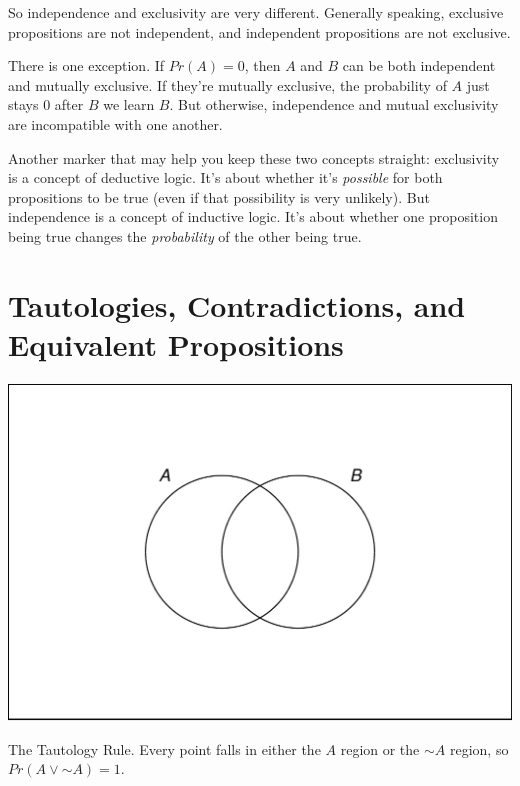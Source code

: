 \documentclass[justified]{tufte-book}
\renewcommand{\neg}{\mathbin{\sim}}
\newcommand{\p}{Pr}
\theoremstyle{definition}
\theoremstyle{definition}
\theoremstyle{definition}
\theoremstyle{remark}
\begin{document}
So independence and exclusivity are very different. Generally speaking,
exclusive propositions are not independent, and independent propositions
are not exclusive.

There is one exception. If \(\p(A) = 0\), then \(A\) and \(B\) can be
both independent and mutually exclusive. If they're mutually exclusive,
the probability of \(A\) just stays \(0\) after \(B\) we learn \(B\).
But otherwise, independence and mutual exclusivity are incompatible with
one another.

Another marker that may help you keep these two concepts straight:
exclusivity is a concept of deductive logic. It's about whether it's
\emph{possible} for both propositions to be true (even if that
possibility is very unlikely). But independence is a concept of
inductive logic. It's about whether one proposition being true changes
the \emph{probability} of the other being true.

\hypertarget{tautologies-contradictions-and-equivalent-propositions}{%
\section{Tautologies, Contradictions, and Equivalent
Propositions}\label{tautologies-contradictions-and-equivalent-propositions}}

\begin{marginfigure}
\includegraphics{_main_files/figure-latex/unnamed-chunk-55-1} \caption[The Tautology Rule]{The Tautology Rule. Every point falls in either the $A$ region or the $\neg A$ region, so $\p(A \vee \neg A) = 1$.}\label{fig:unnamed-chunk-55}
\end{marginfigure}
\end{document}
